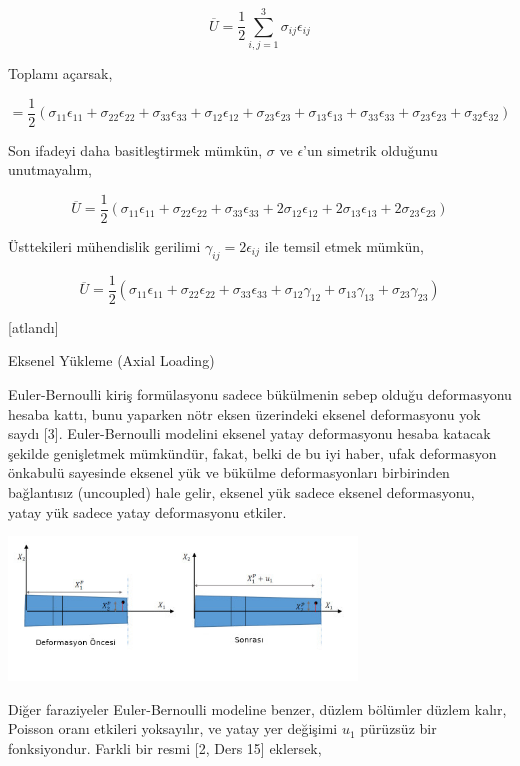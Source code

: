 \documentclass[12pt,fleqn]{article}\usepackage{../../common}
\begin{document}
$$
\overline{U} = \frac{1}{2} \sum_{i,j=1}^{3} \sigma_{ij} \epsilon_{ij}
$$

Toplamı açarsak,

$$
= \frac{1}{2} (\sigma_{11}\epsilon_{11} + \sigma_{22}\epsilon_{22}  +
\sigma_{33}\epsilon_{33} + \sigma_{12}\epsilon_{12} + \sigma_{23}\epsilon_{23} +
\sigma_{13}\epsilon_{13} + \sigma_{33}\epsilon_{33} + \sigma_{23}\epsilon_{23} +
\sigma_{32}\epsilon_{32} )
$$

Son ifadeyi daha basitleştirmek mümkün, $\sigma$ ve $\epsilon$'un simetrik
olduğunu unutmayalım,

$$
\overline{U} = \frac{1}{2} (\sigma_{11}\epsilon_{11} + \sigma_{22}\epsilon_{22}  +
\sigma_{33}\epsilon_{33} + 2 \sigma_{12}\epsilon_{12} +
2 \sigma_{13}\epsilon_{13} + 2 \sigma_{23}\epsilon_{23} )
$$

Üsttekileri mühendislik gerilimi $\gamma_{ij} = 2 \epsilon_{ij}$ ile temsil
etmek mümkün,

$$
\overline{U} = \frac{1}{2} (\sigma_{11}\epsilon_{11} + \sigma_{22}\epsilon_{22}  +
\sigma_{33}\epsilon_{33} + \sigma_{12}\gamma_{12} +
\sigma_{13}\gamma_{13} + \sigma_{23}\gamma_{23} )
$$
 
[atlandı]

Eksenel Yükleme (Axial Loading)

Euler-Bernoulli kiriş formülasyonu sadece bükülmenin sebep olduğu deformasyonu
hesaba kattı, bunu yaparken nötr eksen üzerindeki eksenel deformasyonu yok saydı
[3]. Euler-Bernoulli modelini eksenel yatay deformasyonu hesaba katacak şekilde
genişletmek mümkündür, fakat, belki de bu iyi haber, ufak deformasyon önkabulü
sayesinde eksenel yük ve bükülme deformasyonları birbirinden bağlantısız
(uncoupled) hale gelir, eksenel yük sadece eksenel deformasyonu, yatay yük
sadece yatay deformasyonu etkiler.

\includegraphics[width=25em]{phy_020_strs_04_06.jpg}

Diğer faraziyeler Euler-Bernoulli modeline benzer, düzlem bölümler düzlem kalır,
Poisson oranı etkileri yoksayılır, ve yatay yer değişimi $u_1$ pürüzsüz bir
fonksiyondur. Farkli bir resmi [2, Ders 15] eklersek,
\end{document}
